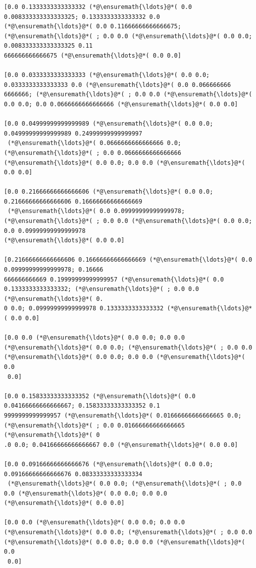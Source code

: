 \documentclass[12pt,a4paper]{article}
\begin{document}
\begin{lstlisting}
[0.0 0.1333333333333332 (*@\ensuremath{\ldots}@*( 0.0 0.008333333333333325; 0.1333333333333332 0.0 
(*@\ensuremath{\ldots}@*( 0.0 0.11666666666666675; (*@\ensuremath{\ldots}@*( ; 0.0 0.0 (*@\ensuremath{\ldots}@*( 0.0 0.0; 0.008333333333333325 0.11
666666666666675 (*@\ensuremath{\ldots}@*( 0.0 0.0]

[0.0 0.0333333333333333 (*@\ensuremath{\ldots}@*( 0.0 0.0; 0.0333333333333333 0.0 (*@\ensuremath{\ldots}@*( 0.0 0.066666666
6666666; (*@\ensuremath{\ldots}@*( ; 0.0 0.0 (*@\ensuremath{\ldots}@*( 0.0 0.0; 0.0 0.0666666666666666 (*@\ensuremath{\ldots}@*( 0.0 0.0]

[0.0 0.04999999999999989 (*@\ensuremath{\ldots}@*( 0.0 0.0; 0.04999999999999989 0.24999999999999997
 (*@\ensuremath{\ldots}@*( 0.0666666666666666 0.0; (*@\ensuremath{\ldots}@*( ; 0.0 0.0666666666666666 (*@\ensuremath{\ldots}@*( 0.0 0.0; 0.0 0.0 (*@\ensuremath{\ldots}@*( 
0.0 0.0]

[0.0 0.21666666666666606 (*@\ensuremath{\ldots}@*( 0.0 0.0; 0.21666666666666606 0.16666666666666669
 (*@\ensuremath{\ldots}@*( 0.0 0.09999999999999978; (*@\ensuremath{\ldots}@*( ; 0.0 0.0 (*@\ensuremath{\ldots}@*( 0.0 0.0; 0.0 0.09999999999999978 
(*@\ensuremath{\ldots}@*( 0.0 0.0]

[0.21666666666666606 0.16666666666666669 (*@\ensuremath{\ldots}@*( 0.0 0.09999999999999978; 0.16666
666666666669 0.19999999999999957 (*@\ensuremath{\ldots}@*( 0.0 0.1333333333333332; (*@\ensuremath{\ldots}@*( ; 0.0 0.0 (*@\ensuremath{\ldots}@*( 0.
0 0.0; 0.09999999999999978 0.1333333333333332 (*@\ensuremath{\ldots}@*( 0.0 0.0]

[0.0 0.0 (*@\ensuremath{\ldots}@*( 0.0 0.0; 0.0 0.0 (*@\ensuremath{\ldots}@*( 0.0 0.0; (*@\ensuremath{\ldots}@*( ; 0.0 0.0 (*@\ensuremath{\ldots}@*( 0.0 0.0; 0.0 0.0 (*@\ensuremath{\ldots}@*( 0.0
 0.0]

[0.0 0.15833333333333352 (*@\ensuremath{\ldots}@*( 0.0 0.04166666666666667; 0.15833333333333352 0.1
9999999999999957 (*@\ensuremath{\ldots}@*( 0.01666666666666665 0.0; (*@\ensuremath{\ldots}@*( ; 0.0 0.01666666666666665 (*@\ensuremath{\ldots}@*( 0
.0 0.0; 0.04166666666666667 0.0 (*@\ensuremath{\ldots}@*( 0.0 0.0]

[0.0 0.09166666666666676 (*@\ensuremath{\ldots}@*( 0.0 0.0; 0.09166666666666676 0.08333333333333334
 (*@\ensuremath{\ldots}@*( 0.0 0.0; (*@\ensuremath{\ldots}@*( ; 0.0 0.0 (*@\ensuremath{\ldots}@*( 0.0 0.0; 0.0 0.0 (*@\ensuremath{\ldots}@*( 0.0 0.0]

[0.0 0.0 (*@\ensuremath{\ldots}@*( 0.0 0.0; 0.0 0.0 (*@\ensuremath{\ldots}@*( 0.0 0.0; (*@\ensuremath{\ldots}@*( ; 0.0 0.0 (*@\ensuremath{\ldots}@*( 0.0 0.0; 0.0 0.0 (*@\ensuremath{\ldots}@*( 0.0
 0.0]


\end{lstlisting}
\end{document}
